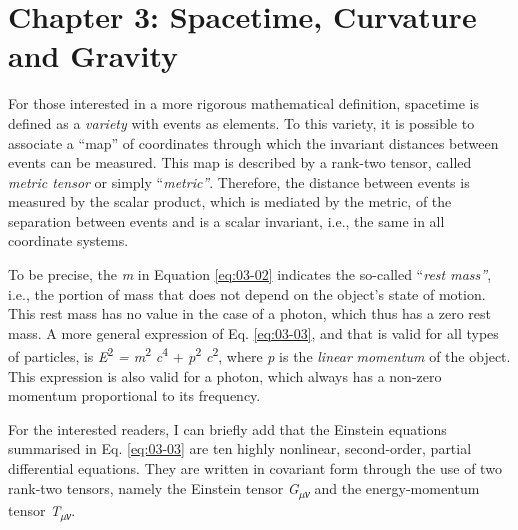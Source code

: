 \section*{Chapter 3: Spacetime, Curvature and Gravity}
\begin{description}[style=multiline,leftmargin=2em,labelwidth=1.5em]

\item[1.]\hypertarget{note:03-01}{}For those interested in a more rigorous mathematical definition, spacetime is defined
as a \emph{variety} with events as elements. To this variety, it is possible to
associate a ``map'' of coordinates through which the invariant
distances between events can be measured. This map is described by a rank-two tensor,
called \emph{metric tensor} or simply
``\emph{metric}\emph{''}. Therefore, the distance between events is
measured by the scalar product, which is mediated by the metric, of the separation
between events and is a scalar invariant, i.e., the same in all coordinate systems.

\item[2.]\hypertarget{note:03-02}{}To be precise, the \emph{m} in Equation \eqref{eq:03-02} indicates the so-called ``\emph{rest
mass''},  i.e., the portion of mass that does not depend on the
object's state of motion. This rest mass has no value in the case of a photon, which
thus has a zero rest mass. A more general expression of Eq. \eqref{eq:03-03}, and that is valid for
all types of particles, is \emph{E}\textsuperscript{2} \emph{= m}\textsuperscript{2}
\emph{c}\textsuperscript{4} + \emph{p}\textsuperscript{2} \emph{c}\textsuperscript{2},
where \emph{p} is the \emph{linear} \emph{momentum} of the object. This expression is
also valid for a photon, which always has a non-zero momentum proportional to its
frequency.

\item[3.]\hypertarget{note:03-03}{}For the interested readers, I can briefly add that the Einstein equations summarised
in Eq. \eqref{eq:03-03} are ten highly nonlinear, second-order, partial
differential equations. They are written in
covariant form through the use of two rank-two tensors, namely the
Einstein tensor \emph{G\textsubscript{µν}} and the energy-momentum
tensor \emph{T\textsubscript{µν}}.


\end{description}

